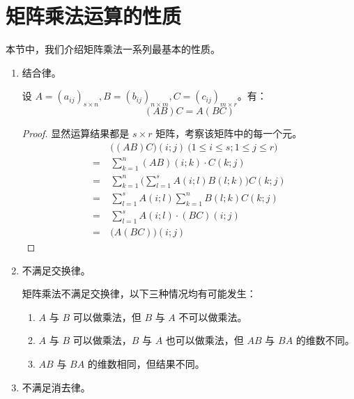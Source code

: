 
\section{矩阵乘法运算的性质}

本节中，我们介绍矩阵乘法一系列最基本的性质。

\begin{enumerate}
	\item 结合律。

	\begin{theorem}[矩阵乘法的结合律]
		设 $A = (a_{ij})_{s \times n}, B = (b_{ij})_{n \times m}, C = (c_{ij})_{m \times r}$。有：
		$$
		(AB)C = A(BC)
		$$
	\end{theorem}

	\begin{proof}
		显然运算结果都是 $s \times r$ 矩阵，考察该矩阵中的每一个元。
		$$
		\begin{aligned}&
			\bigl( (AB)C \bigr)(i; j) \pod{1 \le i \le s; 1 \le j \le r}
			\\=~&
			\sum\limits_{k = 1}^n (AB)(i; k) \cdot C(k; j)
			\\=~&
			\sum\limits_{k = 1}^n \biggl( \sum\limits_{l = 1}^s A(i; l) B(l; k) \biggr) C(k; j)
			\\=~&
			\sum\limits_{l = 1}^s A(i; l) \sum\limits_{k = 1}^n B(l; k) C(k; j)
			\\=~&
			\sum\limits_{l = 1}^s A(i; l) \cdot (BC)(i; j)
			\\=~&
			\bigl( A(BC) \bigr)(i; j)
		\end{aligned}
		$$
	\end{proof}

	\item 不满足交换律。

	矩阵乘法不满足交换律，以下三种情况均有可能发生：
	\begin{enumerate}
		\item $A$ 与 $B$ 可以做乘法，但 $B$ 与 $A$ 不可以做乘法。
		\item $A$ 与 $B$ 可以做乘法，$B$ 与 $A$ 也可以做乘法，但 $AB$ 与 $BA$ 的维数不同。
		\item $AB$ 与 $BA$ 的维数相同，但结果不同。
	\end{enumerate}

	\item 不满足消去律。


\end{enumerate}
